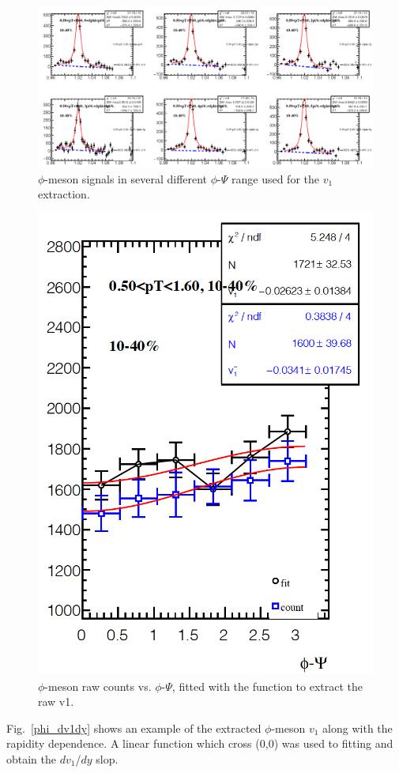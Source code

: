 \begin{figure}[h]
\includegraphics[width=0.98\linewidth]{chapterY/fig/phi_invEP_v1_10_40.png}
\caption{$\phi$-meson signals in several different $\phi$-$\Psi$ range used for the $v_1$ extraction.}
\label{phi_v1}
\end{figure}

\begin{figure}[h]
\includegraphics[width=0.55\linewidth]{chapterY/fig/phi_invEP_v1_10_40_fit.png}
  \caption{$\phi$-meson raw counts vs. $\phi$-$\Psi$, fitted with the function to extract the raw v1.}
\label{phi_v1_fit}
\end{figure}

Fig.~\ref{phi_dv1dy} shows an example of the extracted $\phi$-meson $v_1$ along with the rapidity dependence. A linear function which cross (0,0) was used to fitting and obtain the $dv_{1}$/$dy$ slop.

